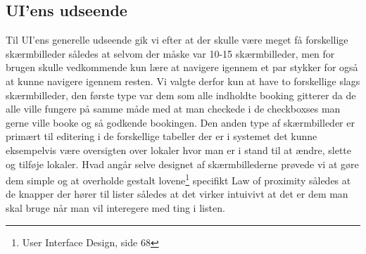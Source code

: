 \subsection{UI'ens udseende}
Til UI'ens generelle udseende gik vi efter at der skulle være meget få forskellige skærmbilleder således at selvom der måske var 10-15 skærmbilleder, men for brugen skulle vedkommende kun lære at navigere igennem et par stykker for også at kunne navigere igennem resten.
Vi valgte derfor kun at have to forskellige slags skærmbilleder, den første type var dem som alle indholdte booking gitterer da de alle ville fungere på samme måde med at man checkede i de checkboxses man gerne ville booke og så godkende bookingen. Den anden type af skærmbilleder er primært til editering i de forskellige tabeller der er i systemet det kunne eksempelvis være oversigten over lokaler hvor man er i stand til at ændre, slette og tilføje lokaler. Hvad angår selve designet af skærmbillederne prøvede vi at gøre dem simple og at overholde gestalt lovene\footnote{User Interface Design, side 68} specifikt Law of proximity således at de knapper der hører til lister således at det virker intuivivt at det er dem man skal bruge når man vil interegere med ting i listen. 

